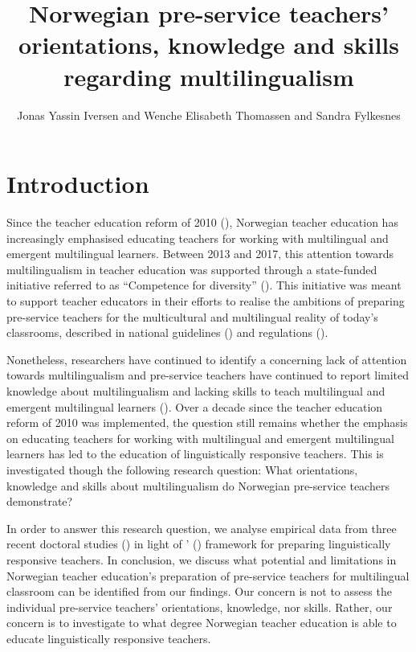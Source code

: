 \documentclass[output=paper]{langscibook}
\author{Jonas Yassin Iversen\orcid{}\affiliation{Inland Norway University of Applied Sciences} and Wenche Elisabeth Thomassen\orcid{}\affiliation{University of Stavanger} and Sandra Fylkesnes\orcid{}\affiliation{Østfold University College}}
\title[Teachers’ orientations, knowledge and skills regarding multilingualism]{Norwegian pre-service teachers’ orientations, knowledge and skills regarding multilingualism}
\begin{document}
\maketitle
\label{chap:6}

\section{Introduction}

Since the teacher education reform of 2010 (\citealt{Ministry_of_education_and_research2010, MER2016}), Norwegian teacher education has increasingly emphasised educating teachers for working with multilingual and emergent multilingual learners. Between 2013 and 2017, this attention towards multilingualism in teacher education was supported through a state-funded initiative referred to as “Competence for diversity” (\citealt{UHR2016}). This initiative was meant to support teacher educators in their efforts to realise the ambitions of preparing pre-service teachers for the multicultural and multilingual reality of today’s classrooms, described in national guidelines (\citealt{UHR2016}) and regulations (\citealt{MER2010, MER2016}).

Nonetheless, researchers have continued to identify a concerning lack of attention towards multilingualism and pre-service teachers have continued to report limited knowledge about multilingualism and lacking skills to teach multilingual and emergent multilingual learners (\citealt{DyrnesEtAl2015,RandenEtAl2015,Skrefsrud2015-1,The_evaluation_group2015}). Over a decade since the teacher education reform of 2010 was implemented, the question still remains whether the emphasis on educating teachers for working with multilingual and emergent multilingual learners has led to the education of linguistically responsive teachers. This is investigated though the following research question: What orientations, knowledge and skills about multilingualism do Norwegian pre-service teachers demonstrate?

In order to answer this research question, we analyse empirical data from three recent doctoral studies (\citealt{Fylkesnes2019,Iversen2020,Thomassen2021}) in light of \citeauthor{LucasVillegas2011}' (\citeyear{LucasVillegas2011,Lucas2013}) framework for preparing linguistically responsive teachers. In conclusion, we discuss what potential and limitations in Norwegian teacher education’s preparation of pre-service teachers for multilingual classroom can be identified from our findings. Our concern is not to assess the individual pre-service teachers’ orientations, knowledge, nor skills. Rather, our concern is to investigate to what degree Norwegian teacher education is able to educate linguistically responsive teachers.
\end{document}
